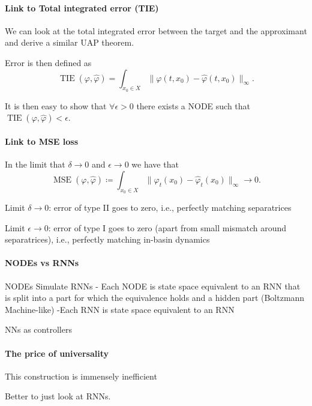 \documentclass{article}
\theoremstyle{definition}
\theoremstyle{remark}
\newcounter{ct}
\begin{document}
\paragraph{Link to Total integrated error (TIE)}
We can look at the total integrated error between the target and the approximant and derive a similar UAP theorem.

Error is then defined as 
\begin{equation}
\operatorname{TIE}(\varphi, \hat{\varphi}) = \int_{x_0\in X}\|\varphi(t,x_0) - \hat{\varphi}(t, x_0)\|_\infty.
\end{equation}

It is then easy to show that $\forall\epsilon>0$ there exists a NODE such that $\operatorname{TIE}(\varphi, \hat{\varphi})<\epsilon$.

\paragraph{Link to MSE loss}
In the limit that $\delta\rightarrow 0$ and $\epsilon\rightarrow 0$  we have that 
\[\operatorname{MSE}(\varphi, \hat{\varphi}) \coloneqq \int_{x_0\in X} \|\varphi_t(x_0) - \hat{\varphi}_t(x_0)\|_\infty \rightarrow 0.\]


Limit $\delta\rightarrow 0$: error of type II goes to zero, i.e., perfectly matching separatrices


Limit $\epsilon\rightarrow 0$: error of type I goes to zero (apart from small mismatch around separatrices), i.e., perfectly matching in-basin dynamics


\paragraph{NODEs vs RNNs}
NODEs Simulate RNNs 
- Each NODE is state space equivalent to an RNN that is split into a part for which the equivalence holds and a hidden part (Boltzmann Machine-like)
-Each RNN is state space equivalent to an RNN



NNs as controllers \citep{sontag1992neural}


\paragraph{The price of universality}
This construction is immensely inefficient

Better to just look at RNNs. 



\newpage

\end{document}
